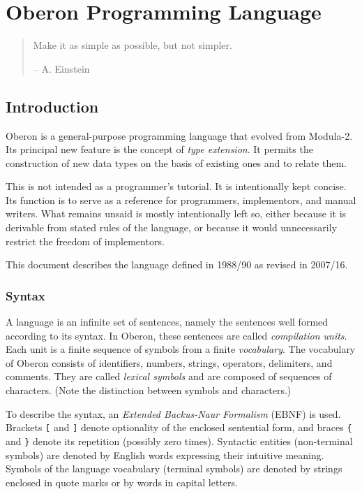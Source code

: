 \chapter{Oberon Programming Language}\let\thefootnote\relax%
\begin{quotation}
  Make it as simple as possible, but not simpler.
  \begin{flushright}
    -- A. Einstein
  \end{flushright}
\end{quotation}

\section{Introduction}
Oberon is a general-purpose programming language that evolved from Modula-2. Its principal new
feature is the concept of \emph{type extension}. It permits the construction of new data types
on the basis of existing ones and to relate them.

This is not intended as a programmer's tutorial. It is intentionally kept concise. Its function
is to serve as a reference for programmers, implementors, and manual writers. What remains
unsaid is mostly intentionally left so, either because it is derivable from stated rules of the
language, or because it would unnecessarily restrict the freedom of implementors.

This document describes the language defined in 1988/90 as revised in 2007/16.

\subsection{Syntax}
A language is an infinite set of sentences, namely the sentences well formed according to its
syntax. In Oberon, these sentences are called \emph{compilation units}. Each unit is a finite
sequence of symbols from a finite \emph{vocabulary}. The vocabulary of Oberon consists of
identifiers, numbers, strings, operators, delimiters, and comments. They are called \emph{lexical
symbols} and are composed of sequences of characters. (Note the distinction between symbols and
characters.)

To describe the syntax, an \emph{Extended Backus-Naur Formalism} (EBNF) is used. Brackets
\verb|[| and \verb|]| denote optionality of the enclosed sentential form, and braces \verb|{| and
\verb|}| denote its repetition (possibly zero times). Syntactic entities (non-terminal symbols)
are denoted by English words expressing their intuitive meaning. Symbols of the language vocabulary
(terminal symbols) are denoted by strings enclosed in quote marks or by words in capital letters.

